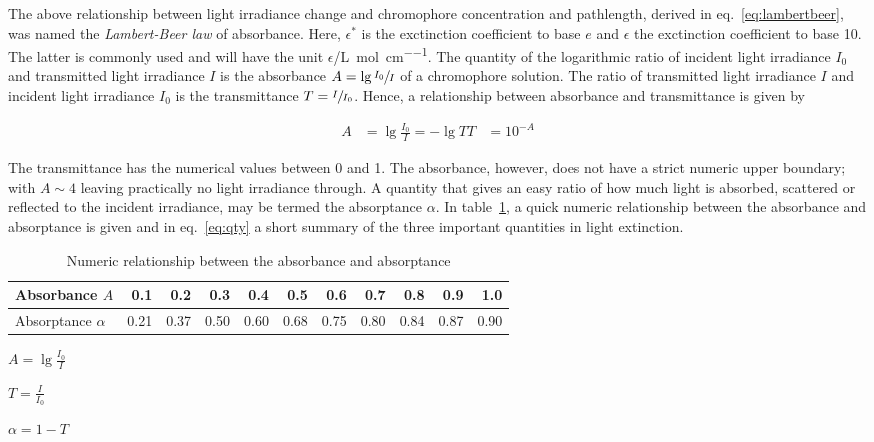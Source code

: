 			The above relationship between light irradiance change and chromophore concentration and pathlength, derived in eq.~\ref{eq:lambertbeer}, was named the \emph{Lambert-Beer law} of absorbance. Here, $\epsilon^{\ast}$ is the exctinction coefficient to base $e$ and $\epsilon$ the exctinction coefficient to base 10. The latter is commonly used and will have the unit $\epsilon$/\unit{\L\per\mol\per\cm}. The quantity of the logarithmic ratio of incident light irradiance $I_0$ and transmitted light irradiance $I$ is the absorbance $A = \lg\sfrac{I_0}{I}$ of a chromophore solution. The ratio of transmitted light irradiance $I$ and incident light irradiance $I_0$ is the transmittance $T = \sfrac{I}{I_0}$. Hence, a relationship between absorbance and transmittance is given by
 
			\begin{equation}
			\begin{split}
				A &= \lg\frac{I_0}{I} = -\lg T
				T &= 10^{-A}
			\end{split}
			\end{equation}

			The transmittance has the numerical values between 0 and 1. The absorbance, however, does not have a strict numeric upper boundary; with $A \sim 4$ leaving practically no light irradiance through. A quantity that gives an easy ratio of how much light is absorbed, scattered or reflected to the incident irradiance, may be termed the absorptance $\alpha$. In table~\ref{tab:absorptance}, a quick numeric relationship between the absorbance and absorptance is given and in eq.~\ref{eq:qty} a short summary of the three important quantities in light extinction.

			\begin{table}[h]
			\label{tab:absorptance}
			\caption{Numeric relationship between the absorbance and absorptance}
			\begin{tabular}{%
				@{}l|rrrrrrrrrr@{}
			}
				Absorbance $A$		& 0.1 & 0.2 & 0.3 & 0.4 & 0.5 & 0.6 & 0.7 & 0.8 & 0.9 & 1.0 \\
				\midrule
				Absorptance $\alpha$& 0.21 & 0.37 & 0.50 & 0.60 & 0.68 & 0.75 & 0.80 & 0.84 & 0.87 & 0.90 

			\end{tabular}
			\end{table}

			\begin{description}
			\label{lst:qty}
				\item[Absorbance]$A = \lg\frac{I_0}{I}$ \\
				\item[Transmittance]$T = \frac{I}{I_0}$ \\
				\item[Absorptance]$\alpha = 1 - T$
			\end{description}

